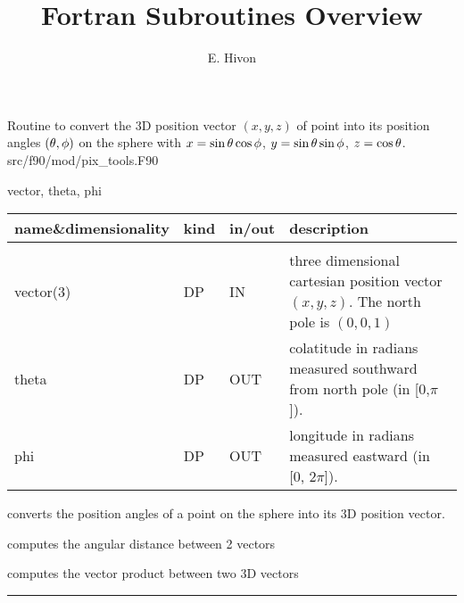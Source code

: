 

\sloppy


\title{\healpix Fortran Subroutines Overview}
 \section[vec2ang]{ }
\label{sub:vec2ang}
\author{E. Hivon}

\begin{facility}
{Routine to convert the 3D position vector $(x,y,z)$ of point into its position
  angles  $(\theta,\phi)$ on the sphere with
$x = \sin\theta\cos\phi$, $y=\sin\theta\sin\phi$, $z=\cos\theta$.
}
{src/f90/mod/pix\_tools.F90}
\end{facility}

\begin{f90format}
{vector, theta, phi}
\end{f90format}


\begin{arguments}
{
\begin{tabular}{p{0.3\hsize} p{0.05\hsize} p{0.1\hsize} p{0.45\hsize}} \hline  
\textbf{name\&dimensionality} & \textbf{kind} & \textbf{in/out} & \textbf{description} \\ \hline
                   &   &   &                           \\ %
vector(3) & DP & IN & three dimensional cartesian position vector
                   $(x,y,z)$. The north pole is $(0,0,1)$\\
theta & DP & OUT & colatitude in radians measured southward from north pole (in
    [0,$\pi$]). \\
phi   & DP & OUT & longitude in radians measured eastward (in [0, $2\pi$]).\\
\end{tabular}
}
\end{arguments}

\begin{related}
  \begin{sulist}{} %
  \item[\htmlref{ang2vec}{sub:ang2vec}] converts the position angles of a point on the sphere 
into its 3D position vector.
  \item[\htmlref{angdist}{sub:angdist}] computes the angular distance between 2 vectors
  \item[\htmlref{vect\_prod}{sub:vect_prod}] computes the vector product between two 3D vectors
  \end{sulist}
\end{related}

\rule{\hsize}{2mm}


